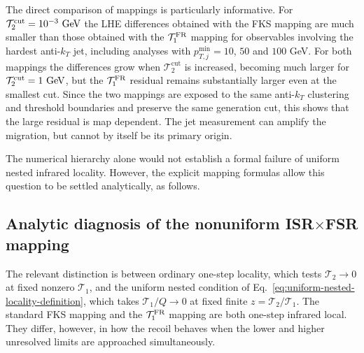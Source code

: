 \documentclass[11pt]{article}
\newcommand{\cut}{\mathrm{cut}}
\begin{document}
The direct comparison of mappings is particularly informative. For
$\mathcal T_2^{\cut}=10^{-3}\ {\rm GeV}$ the LHE differences obtained with the FKS mapping are much smaller than
those obtained with the $\mathcal T_1^{\rm FR}$ mapping for observables involving the hardest anti-$k_T$ jet,
including analyses with $p_{T,j}^{\min}=10$, $50$ and $100$ GeV. For both mappings the differences grow when
$\mathcal T_2^{\cut}$ is increased, becoming much larger for $\mathcal T_2^{\cut}=1\ {\rm GeV}$, but the
$\mathcal T_1^{\rm FR}$ residual remains substantially larger even at the smallest cut. Since the two mappings
are exposed to the same anti-$k_T$ clustering and threshold boundaries and preserve the same generation cut,
this shows that the large residual is map dependent. The jet measurement can amplify the migration, but cannot
by itself be its primary origin.

The numerical hierarchy alone would not establish a formal failure of uniform nested infrared locality.
However, the explicit mapping formulas allow this question to be settled analytically, as follows.

\subsection{Analytic diagnosis of the nonuniform \texorpdfstring{ISR$\times$FSR}{ISR x FSR} mapping}
\label{subsec:z1j-isrfsr-mapping-diagnosis}

The relevant distinction is between ordinary one-step locality, which tests $\mathcal T_2\to0$ at fixed
nonzero $\mathcal T_1$, and the uniform nested condition of Eq.~\eqref{eq:uniform-nested-locality-definition},
which takes $\mathcal T_1/Q\to0$ at fixed finite $z=\mathcal T_2/\mathcal T_1$.  The standard FKS mapping and
the $\mathcal T_1^{\rm FR}$ mapping are both one-step infrared local.  They differ, however, in how the
recoil behaves when the lower and higher unresolved limits are approached simultaneously.
\end{document}
